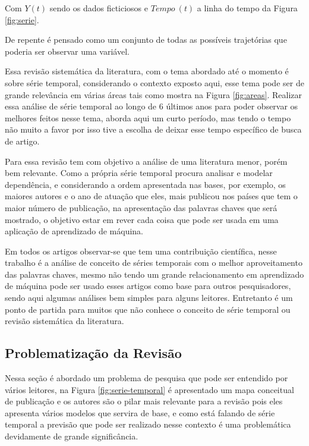 

Com $Y(t)$ sendo os dados ficticiosos e $Tempo \ (t)$ a linha do tempo da Figura \ref{fig:serie}.

De repente é pensado como um conjunto de todas as possíveis trajetórias que poderia ser observar uma variável.


Essa revisão sistemática da literatura, com o tema abordado até o momento é sobre série temporal, considerando o contexto exposto aqui, esse tema pode ser de grande relevância em várias áreas tais como mostra na Figura \ref{fig:areas}. Realizar essa análise de série temporal ao longo de 6 últimos anos para poder observar os melhores feitos nesse tema, aborda aqui um curto período, mas tendo o tempo não muito a favor por isso tive a escolha de deixar esse tempo específico de busca de artigo.

Para essa revisão tem com objetivo a análise de uma literatura menor, porém bem relevante. Como a própria série temporal procura analisar e modelar dependência, e considerando a ordem apresentada nas bases, por exemplo, os maiores autores e o ano de atuação que eles, mais publicou nos países que tem o maior número de publicação, na apresentação das palavras chaves que será mostrado, o objetivo estar em rever cada coisa que pode ser usada em uma aplicação de aprendizado de máquina.

Em todos os artigos observar-se que tem uma contribuição científica, nesse trabalho é a análise de conceito de séries temporais com o melhor aproveitamento das palavras chaves, mesmo não tendo um grande relacionamento em aprendizado de máquina pode ser usado esses artigos como base para outros pesquisadores, sendo aqui algumas análises bem simples para alguns leitores. Entretanto é um ponto de partida para muitos que não conhece o conceito de série temporal ou revisão sistemática da literatura.


\subsection{Problematiza\c c\~ao da Revis\~ao} \label{subsec: problematização da revisão}

Nessa seção é abordado um problema de pesquisa que pode ser entendido por vários leitores, na Figura \ref{fig:serie-temporal} é apresentado um mapa conceitual de publicação e os autores são o pilar mais relevante para a revisão pois eles apresenta vários modelos que servira de base, e como está falando de série temporal a previsão que pode ser realizado nesse contexto é uma problemática devidamente de grande significância.

